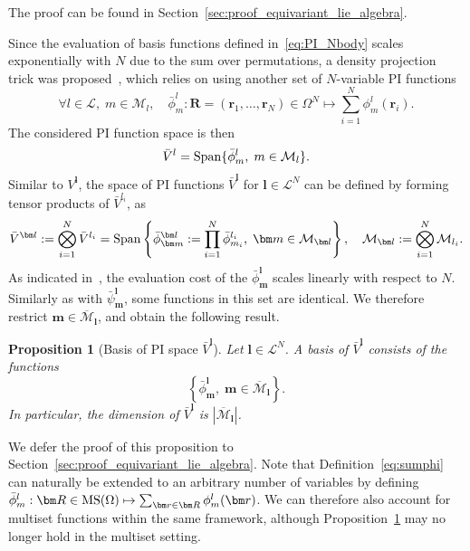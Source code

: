 \documentclass{article}
\newcommand{\bphi}[2]{\bar\phi^{#1}_{#2}}
\newcommand{\bpsi}[2]{\bar\psi^{#1}_{#2}}
\newcommand{\bV}{{\bar V}}
\newcommand{\card}[1]{|{#1}|}
\newtheorem{proposition}[theorem]{Proposition}
\numberwithin{equation}{section}
\def\br{{\bm r}}
\def\bl{{\bm l}}
\def\bbm{{\bm m}}
\def\bR{{\bm R}}
\def\calM{\mathcal{M}}
\def\calL{\mathcal{L}}
\def\oMl{\overline{\calM}_\bl}
\def\Nat{{N}}
\begin{document}
The proof can be found in Section~\ref{sec:proof_equivariant_lie_algebra}.

Since the evaluation of basis functions defined in~\eqref{eq:PI_Nbody} scales exponentially with $N$ 
due to the sum over permutations, 
a density projection trick was proposed~\cite{Drautz2019-mn,Dusson2022-ie}, which relies on using another set of $N$-variable PI functions
\begin{equation}
      \forall l\in \calL, \; m\in \calM_l, \quad  
  \bphi{l}{m} : \bR = (\br_1,\ldots,\br_\Nat) \in \Omega^\Nat \mapsto \sum_{i=1}^\Nat \phi^l_m(\br_i).
  \label{eq:sumphi}
\end{equation}
The considered PI function space is then 
\[
    \bV^l = {\rm Span} \{
    \bphi{l}{m}, \; 
    m \in \calM_l
    \}.
\]
Similar to $V^{\bl}$, the space of PI functions $\bV^{\bl}$ for $\bl\in \calL^\Nat$ can be defined by forming tensor products of $\bV^{l_i}$, as 
\[
  \bV^{\bl} := \bigotimes_{i=1}^\Nat \bV^{l_i} = {\rm Span} \left\{  \bphi{\bl}{\bbm} := \prod_{i=1}^\Nat \bphi{l_i}{m_i}, \; 
  \bbm \in \calM_\bl \right\}, \quad  \calM_\bl := \bigotimes_{i=1}^\Nat \calM_{l_i}.
\]
As indicated in~\cite{Dusson2022-ie}, the evaluation cost of the $\bphi{\bl}{\bbm}$ scales linearly with respect to $\Nat$.
Similarly as with $\bpsi{\bl}{\bbm}$, some functions in this set are identical. We therefore restrict $\bbm\in\oMl$, and obtain the following result.


\begin{proposition}[Basis of PI space $\bV^\bl$]\label{prop:basis-pi2}
    Let $\bl\in\calL^\Nat$. A basis of $\bV^{\bl}$ consists of the functions
\[
    \left\{ \bphi{\bl}{\bbm},\; \bbm\in\oMl\right\}.
\]
In particular, the dimension of $\bV^\bl$ is $\card{\oMl}$.
\end{proposition}

We defer the proof of this proposition to Section~\ref{sec:proof_equivariant_lie_algebra}. Note that Definition~\eqref{eq:sumphi} can naturally be extended to an arbitrary number of variables by defining $\bphi{l}{m} : \bR \in \textup{MS}(\Omega) \mapsto \sum_{\br \in \bR } \phi^l_m(\br)$. 
We can therefore also account for multiset functions within the same framework, although Proposition~\ref{prop:basis-pi2} may no longer hold in the multiset setting.
\end{document}
